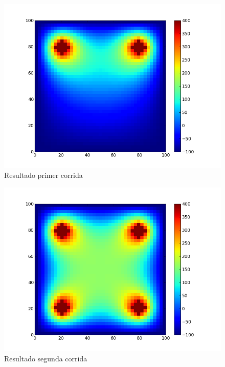 \begin{figure}[htb]
\begin{center}
\includegraphics[scale=0.50]{imagenes/random_1.png} 
\caption{Resultado primer corrida} 
\end{center}
\end{figure}


\begin{figure}[htb]
\begin{center}
\includegraphics[scale=0.50]{imagenes/random_2.png} 
\caption{Resultado segunda corrida} 
\end{center}
\end{figure}
\newpage

